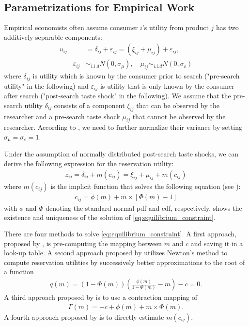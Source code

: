 \documentclass[12pt]{article}
\begin{document}
\subsection{Parametrizations for Empirical Work}

Empirical economists often assume consumer $i$'s utility from product $j$ has two additively separable components:
\begin{align}
    u_{i j} & =\delta_{i j}+\varepsilon_{i j}  =\left(\xi_{i j}+\mu_{i j}\right)+\varepsilon_{i j},\\
    \quad \quad \varepsilon_{i j}&\sim_{i.i.d} N(0,\sigma_{\mu}),\quad \mu_{i j} \sim_{i.i.d} N(0,\sigma_{\varepsilon})\nonumber
\end{align}
where \(\delta_{i j}\) is utility which is known by the consumer prior to search ("pre-search
utility" in the following) and \(\varepsilon_{i j}\) is utility that is only known by the consumer
after search ("post-search taste shock" in the following). 
We assume that the pre-search utility
\(\delta_{i j}\) consists of a component \(\xi_{i j}\) that can be observed by the researcher and a pre-search taste shock \(\mu_{i j}\) that
cannot be observed by the researcher. 
According to \cite{ursu2023sequential}, we need to further normalize their variance by setting $\sigma_{\mu}= \sigma_{\varepsilon} =1$. 

Under the assumption of normally distributed post-search taste shocks, we can derive the following
expression for the reservation utility:
\begin{align}
    z_{i j}=\delta_{i j}+m\left(c_{i j}\right)=\xi_{i j}+\mu_{i j}+m\left(c_{i j}\right) 
\end{align}
where \(m\left(c_{i j} \right)\) is the implicit function that solves the following equation (see \cite{kim2010online}):
\begin{align}
    c_{i j}=\phi(m)+m \times[\Phi(m)-1] \label{eq:equilibrium_constraint}
\end{align}
with \(\phi\) and \(\Phi\) denoting the standard normal pdf and cdf, respectively. \cite{weitzman1979optimal} shows the existence and uniqueness of the solution of \eqref{eq:equilibrium_constraint}.

There are four methods to solve \eqref{eq:equilibrium_constraint}. 
A first approach, proposed by \cite{kim2010online}, is pre-computing the mapping between $m$ and $c$ and saving it in a look-up table.
A second approach proposed by \cite{jiang2021consumer} utilizes Newton's method to compute reservation utilities by successively better approximations to the root
of a function 
\begin{align*}
    q(m)=(1-\Phi(m))\left(\frac{\phi(m)}{1-\Phi(m)}-m\right)-c=0.
\end{align*}
A third approach proposed by \cite{elberg2019dynamic} is to use a contraction mapping of
\begin{align*}
    \Gamma(m)=-c+\phi(m)+m \times \Phi(m).
\end{align*}
A fourth approach proposed by \cite{morozov2023measuring} is to directly estimate $m(c_{ij})$.
\end{document}
